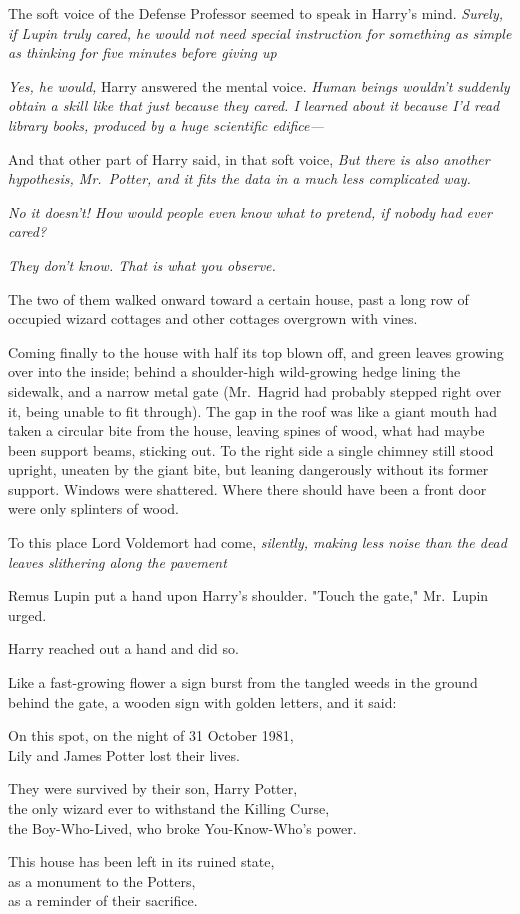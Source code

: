 The soft voice of the Defense Professor seemed to speak in Harry's mind.
\emph{Surely, if Lupin truly cared, he would not need special instruction for
something as simple as thinking for five minutes before giving up{\el}}

\emph{Yes, he would,} Harry answered the mental voice. \emph{Human beings
wouldn't suddenly obtain a skill like that just because they cared. I learned
about it because I'd read library books, produced by a huge scientific
edifice—}

And that other part of Harry said, in that soft voice, \emph{But there is also
another hypothesis, Mr.~Potter, and it fits the data in a much less complicated
way.}

\emph{No it doesn't! How would people even know what to pretend, if nobody had
ever cared?}

\emph{They don't know. That is what you observe.}

The two of them walked onward toward a certain house, past a long row of
occupied wizard cottages and other cottages overgrown with vines.

Coming finally to the house with half its top blown off, and green leaves
growing over into the inside; behind a shoulder-high wild-growing hedge lining
the sidewalk, and a narrow metal gate (Mr.~Hagrid had probably stepped right
over it, being unable to fit through). The gap in the roof was like a giant
mouth had taken a circular bite from the house, leaving spines of wood, what
had maybe been support beams, sticking out. To the right side a single chimney
still stood upright, uneaten by the giant bite, but leaning dangerously without
its former support. Windows were shattered. Where there should have been a
front door were only splinters of wood.

To this place Lord Voldemort had come, \emph{silently, making less noise than
the dead leaves slithering along the pavement{\el}}

Remus Lupin put a hand upon Harry's shoulder. "Touch the gate," Mr.~Lupin urged.

Harry reached out a hand and did so.

Like a fast-growing flower a sign burst from the tangled weeds in the ground
behind the gate, a wooden sign with golden letters, and it said:

\begin{center}
On this spot, on the night of 31 October 1981,\\
Lily and James Potter lost their lives.

They were survived by their son, Harry Potter,\\
the only wizard ever to withstand the Killing Curse,\\
the Boy-Who-Lived, who broke You-Know-Who's power.

This house has been left in its ruined state,\\
as a monument to the Potters,\\
as a reminder of their sacrifice.
\end{center}

